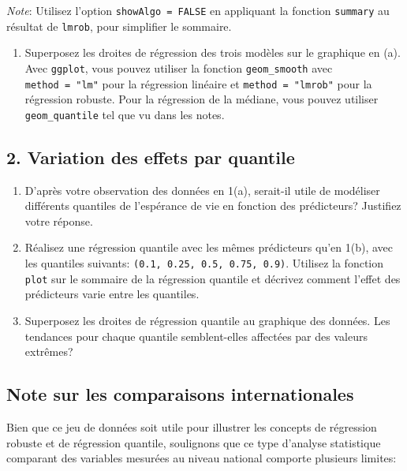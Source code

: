 \documentclass[
]{article}
\providecommand{\tightlist}{%
  \setlength{\itemsep}{0pt}\setlength{\parskip}{0pt}}
\begin{document}
\emph{Note}: Utilisez l'option \texttt{showAlgo\ =\ FALSE} en appliquant
la fonction \texttt{summary} au résultat de \texttt{lmrob}, pour
simplifier le sommaire.

\begin{enumerate}
\def\labelenumi{\alph{enumi})}
\setcounter{enumi}{3}
\tightlist
\item
  Superposez les droites de régression des trois modèles sur le
  graphique en (a). Avec \texttt{ggplot}, vous pouvez utiliser la
  fonction \texttt{geom\_smooth} avec \texttt{method\ =\ "lm"} pour la
  régression linéaire et \texttt{method\ =\ "lmrob"} pour la régression
  robuste. Pour la régression de la médiane, vous pouvez utiliser
  \texttt{geom\_quantile} tel que vu dans les notes.
\end{enumerate}

\hypertarget{variation-des-effets-par-quantile}{%
\subsection{2. Variation des effets par
quantile}\label{variation-des-effets-par-quantile}}

\begin{enumerate}
\def\labelenumi{\alph{enumi})}
\item
  D'après votre observation des données en 1(a), serait-il utile de
  modéliser différents quantiles de l'espérance de vie en fonction des
  prédicteurs? Justifiez votre réponse.
\item
  Réalisez une régression quantile avec les mêmes prédicteurs qu'en
  1(b), avec les quantiles suivants:
  \texttt{(0.1,\ 0.25,\ 0.5,\ 0.75,\ 0.9)}. Utilisez la fonction
  \texttt{plot} sur le sommaire de la régression quantile et décrivez
  comment l'effet des prédicteurs varie entre les quantiles.
\item
  Superposez les droites de régression quantile au graphique des
  données. Les tendances pour chaque quantile semblent-elles affectées
  par des valeurs extrêmes?
\end{enumerate}

\hypertarget{note-sur-les-comparaisons-internationales}{%
\subsection{Note sur les comparaisons
internationales}\label{note-sur-les-comparaisons-internationales}}

Bien que ce jeu de données soit utile pour illustrer les concepts de
régression robuste et de régression quantile, soulignons que ce type
d'analyse statistique comparant des variables mesurées au niveau
national comporte plusieurs limites:
\end{document}
